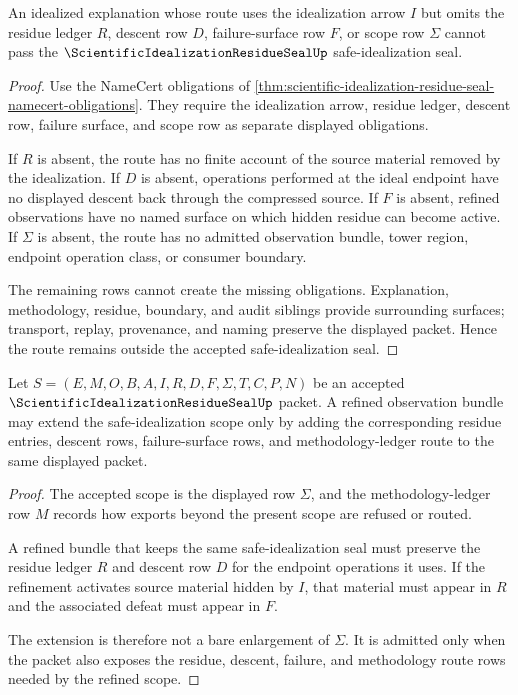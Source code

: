 \begin{theorem}
\label{thm:scientific-idealization-residue-seal-nonescape}
An idealized explanation whose route uses the idealization arrow $I$ but omits the residue ledger $R$, descent row $D$, failure-surface row $F$, or scope row $\Sigma$ cannot pass the $\ScientificIdealizationResidueSealUp$ safe-idealization seal.
\end{theorem}
\begin{proof}
Use the NameCert obligations of \autoref{thm:scientific-idealization-residue-seal-namecert-obligations}. They require the idealization arrow, residue ledger, descent row, failure surface, and scope row as separate displayed obligations.

If $R$ is absent, the route has no finite account of the source material removed by the idealization. If $D$ is absent, operations performed at the ideal endpoint have no displayed descent back through the compressed source. If $F$ is absent, refined observations have no named surface on which hidden residue can become active. If $\Sigma$ is absent, the route has no admitted observation bundle, tower region, endpoint operation class, or consumer boundary.

The remaining rows cannot create the missing obligations. Explanation, methodology, residue, boundary, and audit siblings provide surrounding surfaces; transport, replay, provenance, and naming preserve the displayed packet. Hence the route remains outside the accepted safe-idealization seal.
\end{proof}

\begin{theorem}
\label{thm:scientific-idealization-residue-seal-scope-refinement}
Let $S=(E,M,O,B,A,I,R,D,F,\Sigma,T,C,P,N)$ be an accepted $\ScientificIdealizationResidueSealUp$ packet. A refined observation bundle may extend the safe-idealization scope only by adding the corresponding residue entries, descent rows, failure-surface rows, and methodology-ledger route to the same displayed packet.
\end{theorem}
\begin{proof}
The accepted scope is the displayed row $\Sigma$, and the methodology-ledger row $M$ records how exports beyond the present scope are refused or routed.

A refined bundle that keeps the same safe-idealization seal must preserve the residue ledger $R$ and descent row $D$ for the endpoint operations it uses. If the refinement activates source material hidden by $I$, that material must appear in $R$ and the associated defeat must appear in $F$.

The extension is therefore not a bare enlargement of $\Sigma$. It is admitted only when the packet also exposes the residue, descent, failure, and methodology route rows needed by the refined scope.
\end{proof}

